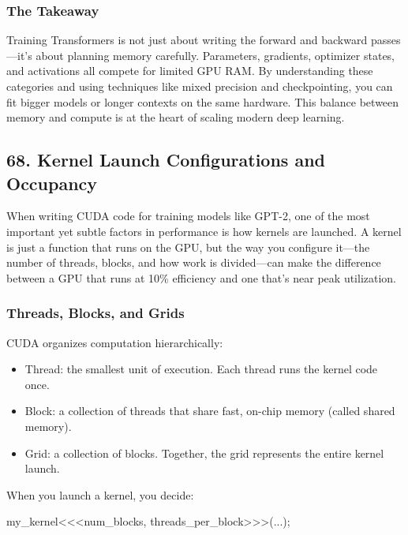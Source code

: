 \documentclass[
  letterpaper,
  DIV=11,
  numbers=noendperiod]{scrreprt}
\newenvironment{Shaded}{\begin{snugshade}}{\end{snugshade}}
\newcommand{\NormalTok}[1]{\textcolor[rgb]{0.00,0.23,0.31}{#1}}
\newcommand{\OperatorTok}[1]{\textcolor[rgb]{0.37,0.37,0.37}{#1}}
\providecommand{\tightlist}{%
  \setlength{\itemsep}{0pt}\setlength{\parskip}{0pt}}
\begin{document}
\subsubsection{The Takeaway}\label{the-takeaway-56}

Training Transformers is not just about writing the forward and backward
passes---it's about planning memory carefully. Parameters, gradients,
optimizer states, and activations all compete for limited GPU RAM. By
understanding these categories and using techniques like mixed precision
and checkpointing, you can fit bigger models or longer contexts on the
same hardware. This balance between memory and compute is at the heart
of scaling modern deep learning.

\subsection{68. Kernel Launch Configurations and
Occupancy}\label{kernel-launch-configurations-and-occupancy}

When writing CUDA code for training models like GPT-2, one of the most
important yet subtle factors in performance is how kernels are launched.
A kernel is just a function that runs on the GPU, but the way you
configure it---the number of threads, blocks, and how work is
divided---can make the difference between a GPU that runs at 10\%
efficiency and one that's near peak utilization.

\subsubsection{Threads, Blocks, and
Grids}\label{threads-blocks-and-grids}

CUDA organizes computation hierarchically:

\begin{itemize}
\tightlist
\item
  Thread: the smallest unit of execution. Each thread runs the kernel
  code once.
\item
  Block: a collection of threads that share fast, on-chip memory (called
  shared memory).
\item
  Grid: a collection of blocks. Together, the grid represents the entire
  kernel launch.
\end{itemize}

When you launch a kernel, you decide:

\begin{Shaded}
\begin{Highlighting}[]
\NormalTok{my\_kernel}\OperatorTok{\textless{}\textless{}\textless{}}\NormalTok{num\_blocks}\OperatorTok{,}\NormalTok{ threads\_per\_block}\OperatorTok{\textgreater{}\textgreater{}\textgreater{}(...);}
\end{Highlighting}
\end{Shaded}
\end{document}

